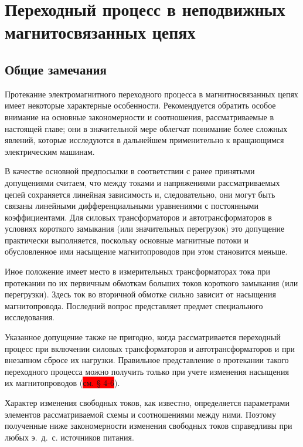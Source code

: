 \chapter{Переходный процесс в неподвижных магнитосвязанных цепях}
\label{chap:4 perehodnyi_protcess_v_nepodvizhnykh_magnitosviazannykh_tcepiakh}

\section{Общие замечания}
\label{sec:4-1 obshchie_zamechaniia}

Протекание электромагнитного переходного процесса в магнитносвязанных цепях имеет некоторые характерные особенности. Рекомендуется обратить особое внимание на основные закономерности и соотношения, рассматриваемые в настоящей главе; они в значительной мере облегчат понимание более сложных явлений, которые исследуются в дальнейшем применительно к вращающимся электрическим машинам.

В качестве основной предпосылки в соответствии с ранее принятыми допущениями считаем, что между токами и напряжениями рассматриваемых цепей сохраняется линейная зависимость и, следовательно, они могут быть связаны линейными дифференциальными уравнениями с постоянными коэффициентами. Для силовых трансформаторов и автотрансформаторов в условиях короткого замыкания (или значительных перегрузок) это допущение практически выполняется, поскольку основные магнитные потоки и обусловленное ими насыщение магнитопроводов при этом становится меньше.

Иное положение имеет место в измерительных трансформаторах тока при протекании по их первичным обмоткам больших токов короткого замыкания (или перегрузки). Здесь ток во вторичной обмотке сильно зависит от насыщения магнитопровода. Последний вопрос представляет предмет специального исследования.

Указанное допущение также не пригодно, когда рассматривается переходный процесс при включении
силовых трансформаторов и автотрансформаторов и при внезапном сбросе их нагрузки. Правильное представление о протекании такого переходного процесса можно получить только при учете изменения насыщения их магнитопроводов (\colorbox{red}{см. § 4-6}).

Характер изменения свободных токов, как известно, определяется параметрами элементов рассматриваемой схемы и соотношениями между ними. Поэтому полученные ниже закономерности изменения свободных токов справедливы при любых э.~д.~с. источников питания.

